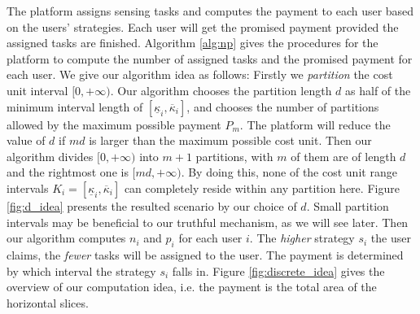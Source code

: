 \documentclass[conference]{IEEEtran}
\theoremstyle{definition}
\begin{document}
The platform assigns sensing tasks and computes the payment to each user based on the users' strategies. Each user will get the promised payment provided the assigned tasks are finished. Algorithm \ref{alg:np} gives the procedures for the platform to compute the number of assigned tasks and the promised payment for each user. 
{\color{black}We give our algorithm idea as follows:
\relax
\bolditem Firstly we {\it partition} the cost unit interval $[0, +\infty)$. Our algorithm chooses the partition length $d$ as half of the minimum interval length of $[\underline{\kappa}_i, \overline{\kappa}_i]$, and chooses the number of partitions allowed by the maximum possible payment $P_m$. The platform will reduce the value of $d$ if $md$ is larger than the maximum possible cost unit. Then our algorithm divides $[0, +\infty)$ into $m+1$ partitions, with $m$ of them are of length $d$ and the rightmost one is $[md, +\infty)$. By doing this, none of the cost unit range intervals $K_i=[\underline{\kappa}_i, \overline{\kappa}_i]$ can completely reside within any partition here. Figure \ref{fig:d_idea} presents the resulted scenario by our choice of $d$. Small partition intervals may be beneficial to our truthful mechanism, as we will see later. 
\bolditem Then our algorithm computes $n_i$ and $p_i$ for each user $i$. The {\it higher} strategy $s_i$ the user claims, the {\it fewer} tasks will be assigned to the user. The payment is determined by which interval the strategy $s_i$ falls in. Figure \ref{fig:discrete_idea} gives the overview of our computation idea, i.e. the payment is the total area of the horizontal slices.
}
\end{document}
